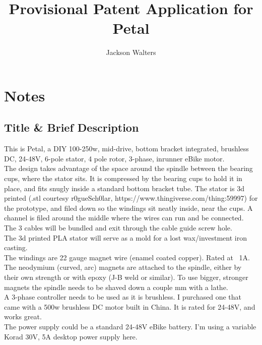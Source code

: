 \documentclass[11pt]{article} %
\title{Provisional Patent Application for Petal}
\author{Jackson Walters}
\begin{document}
\maketitle

\section*{Notes}


\subsection*{Title \& Brief Description}
\noindent This is Petal, a DIY 100-250w, mid-drive, bottom bracket integrated, brushless DC, 24-48V, 6-pole stator, 4 pole rotor, 3-phase, inrunner eBike motor. \\

\noindent The design takes advantage of the space around the spindle between the bearing cups, where the stator sits. It is compressed by the bearing cups to hold it in place, and fits snugly inside a standard bottom bracket tube. The stator is 3d printed (.stl courtesy r0gueSch0lar, https://www.thingiverse.com/thing:59997) for the prototype, and filed down so the windings sit neatly inside, near the cups. A channel is filed around the middle where the wires can run and be connected. The 3 cables will be bundled and exit through the cable guide screw hole. \\

\noindent The 3d printed PLA stator will serve as a mold for a lost wax/investment iron casting.\\

\noindent The windings are 22 gauge magnet wire (enamel coated copper). Rated at ~1A.\\

\noindent The neodymium (curved, arc) magnets are attached to the spindle, either by their own strength or with epoxy (J-B weld or similar). To use bigger, stronger magnets the spindle needs to be shaved down a couple mm with a lathe. \\

\noindent A 3-phase controller needs to be used as it is brushless. I purchased one that came with a 500w brushless DC motor built in China. It is rated for 24-48V, and works great.\\

\noindent The power supply could be a standard 24-48V eBike battery. I'm using a variable Korad 30V, 5A desktop power supply here.\\
\end{document}
